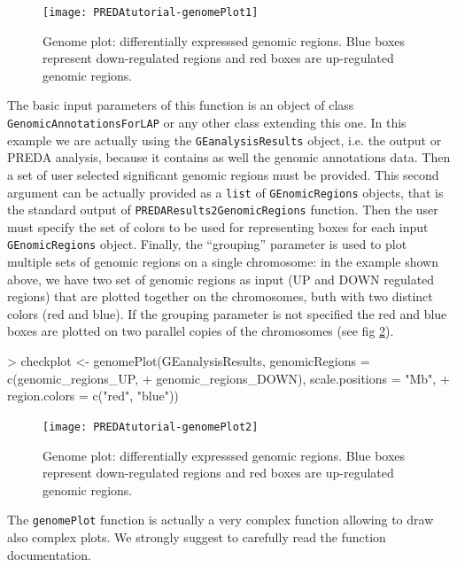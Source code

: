 \documentclass[a4paper,10pt]{article}
\begin{document}
\begin{figure}[htbp]
 \centering
\texttt{[image: PREDAtutorial-genomePlot1]}
 \caption{Genome plot: differentially expresssed genomic regions. Blue boxes represent down-regulated regions and red boxes are up-regulated genomic regions.}
 \label{fig:genomePlot1onlyGE}
\end{figure}


The basic input parameters of this function is an object of class \texttt{GenomicAnnotationsForLAP} or any other class extending this one. In this example we are actually using the \texttt{GEanalysisResults} object, i.e. the output or PREDA analysis, because it contains as well the genomic annotations data. Then a set of user selected significant genomic regions must be provided. This second argument can be actually provided as a \texttt{list} of \texttt{GEnomicRegions} objects, that is the standard output of \texttt{PREDAResults2GenomicRegions} function. Then the user must specify the set of colors to be used for representing boxes for each input \texttt{GEnomicRegions} object. Finally, the ``grouping'' parameter is used to plot multiple sets of genomic regions on a single chromosome: in the example shown above, we have two set of genomic regions as input (UP and DOWN regulated regions) that are plotted together on the chromosomes, buth with two distinct colors (red and blue). If the grouping parameter is not specified the red and blue boxes are plotted on two parallel copies of the chromosomes (see fig  \ref{fig:genomePlot1onlyGE_nogroup}).


\begin{Schunk}
\begin{Sinput}
> checkplot <- genomePlot(GEanalysisResults, genomicRegions = c(genomic_regions_UP, 
+     genomic_regions_DOWN), scale.positions = "Mb", 
+     region.colors = c("red", "blue"))
\end{Sinput}
\end{Schunk}


\begin{figure}[htbp]
 \centering
\texttt{[image: PREDAtutorial-genomePlot2]}
 \caption{Genome plot: differentially expresssed genomic regions. Blue boxes represent down-regulated regions and red boxes are up-regulated genomic regions.}
 \label{fig:genomePlot1onlyGE_nogroup}
\end{figure}

The \texttt{genomePlot} function is actually a very complex function allowing to draw also complex plots. We strongly suggest to carefully read the function documentation.
\end{document}
